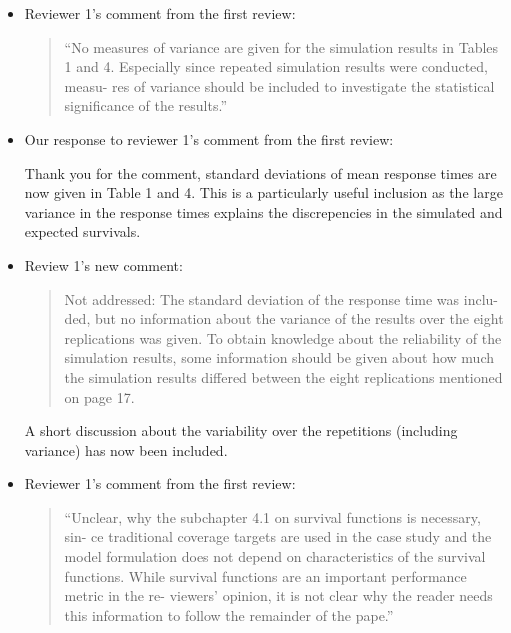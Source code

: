 \documentclass{article}
\begin{document}
\begin{itemize}

\item Reviewer 1's comment from the first review:

\begin{quote}
``No measures of variance are given for the simulation results in Tables 1
and 4. Especially since repeated simulation results were conducted, measu-
res of variance should be included to investigate the statistical significance
of the results.''
\end{quote}

\item Our response to reviewer 1's comment from the first review:

Thank you for the comment, standard deviations of mean response times are now
given in Table 1 and 4. This is a particularly useful inclusion as the
large variance in the response times explains the discrepencies in the
simulated and expected survivals.

\item Review 1's new comment:

\begin{quote}
Not addressed: The standard deviation of the response time was inclu-
ded, but no information about the variance of the results over the eight
replications was given. To obtain knowledge about the reliability of the
simulation results, some information should be given about how much the
simulation results differed between the eight replications mentioned on
page 17.
\end{quote}

A short discussion about the variability over the repetitions (including
variance) has now been included. 

\item Reviewer 1's comment from the first review:

\begin{quote}
``Unclear, why the subchapter 4.1 on survival functions is necessary, sin-
ce traditional coverage targets are used in the case study and the model
formulation does not depend on characteristics of the survival functions.
While survival functions are an important performance metric in the re-
viewers’ opinion, it is not clear why the reader needs this information to
follow the remainder of the pape.''
\end{quote}


\end{itemize}
\end{document}
